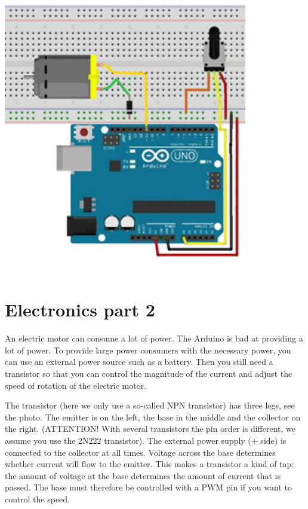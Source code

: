 \documentclass{arduino}
\begin{document}
\begin{center}
\includegraphics[width=0.8\textwidth]{29. Circuit motor control}
\end{center}

\newpage

\section{Electronics part 2}




An electric motor can consume a lot of power. The Arduino is bad at providing a lot of power. To provide large power consumers with the necessary power, you can use an external power source such as a battery. Then you still need a transistor so that you can control the magnitude of the current and adjust the speed of rotation of the electric motor.

The transistor (here we only use a so-called NPN transistor) has three legs, see the photo. The emitter is on the left, the base in the middle and the collector on the right. (ATTENTION! With several transistors the pin order is different, we assume you use the 2N222 transistor). The external power supply (+ side) is connected to the collector at all times. Voltage across the base determines whether current will flow to the emitter. This makes a transistor a kind of tap: the amount of voltage at the base determines the amount of current that is passed. The base must therefore be controlled with a PWM pin if you want to control the speed.
\end{document}

